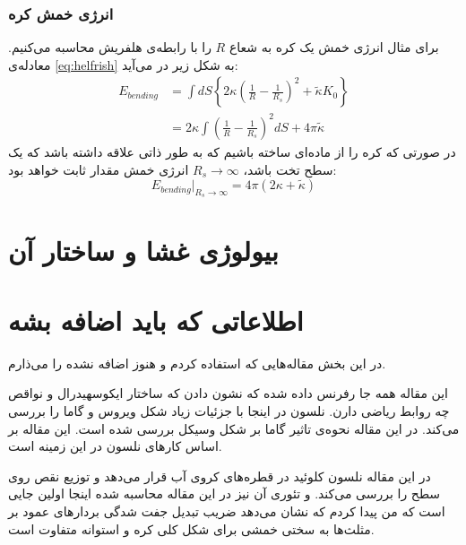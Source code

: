 \subsubsection{
انرژی خمش کره
}
برای مثال انرژی خمش یک کره به شعاع 
$R$
را با رابطه‌ی هلفریش محاسبه می‌کنیم. معادله‌ی 
\ref{eq:helfrish}
به شکل زیر در می‌آید:
\begin{equation}
\begin{aligned}
E_{bending}&=\int dS\left\{2\kappa \left(\frac{1}{R}-\frac{1}{R_s}\right)^2 +\tilde \kappa K_0\right\} \\
&=2\kappa\int \left(\frac{1}{R}-\frac{1}{R_s}\right)^2dS +4\pi\tilde \kappa
\end{aligned}
\end{equation}
در صورتی که کره را از ماده‌ای ساخته باشیم که به طور ذاتی علاقه داشته باشد که یک سطح تخت باشد،‌
$R_s\rightarrow\infty$
انرژی خمش مقدار ثابت خواهد بود:
\begin{equation}
E_{bending}|_{R_s\rightarrow\infty}=4\pi(2\kappa+\tilde\kappa)
\end{equation} 







\section{
بیولوژی غشا و ساختار آن
}

\section{
اطلاعاتی که باید اضافه بشه
}
در این بخش مقاله‌هایی  که استفاده کردم و هنوز اضافه نشده را می‌ذارم.

این مقاله همه جا رفرنس داده شده که نشون دادن که ساختار ایکوسهیدرال و نواقص چه روابط ریاضی دارن.
\cite{CasparKlug1962}
نلسون در اینجا با جزئیات زیاد شکل ویروس و گاما را بررسی می‌کند.
\cite{nelsonPRE2003}
در این مقاله نحوه‌ی تاثیر گاما بر شکل وسیکل بررسی شده است. این مقاله بر اساس کارهای نلسون در این زمینه‌ است.
\cite{gammaPRE2005}

در این مقاله نلسون کلوئید در قطره‌های کروی آب قرار می‌دهد و توزیع نقص روی سطح را بررسی می‌کند.
\cite{NelsonScience2003}
و  تئوری آن نیز در این مقاله‌ محاسبه ‌شده
\cite{NelsonPRB2000}
اینجا اولین جایی است که  من پیدا کردم که نشان می‌دهد ضریب تبدیل جفت شدگی بردارهای عمود بر مثلث‌ها به سختی خمشی برای  شکل  کلی کره و استوانه متفاوت است. 
\cite{GompperKroll1996}












